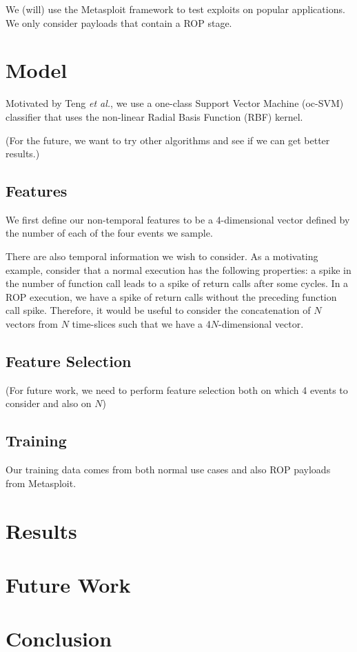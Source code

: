 \documentclass[letterpaper,twocolumn,10pt]{article}
\begin{document}
We (will) use the Metasploit framework to test exploits on popular applications. We only 
consider payloads that contain a ROP stage.

\section{Model}

Motivated by Teng \textit{et al.}, we use a one-class Support Vector Machine (oc-SVM) 
classifier that uses the non-linear Radial Basis Function (RBF) kernel\cite{DBLP:journals/corr/TangSS14}.

(For the future, we want to try other algorithms and see if we can get better results.) 

\subsection*{Features}

We first define our non-temporal features to be a 4-dimensional vector defined 
by the number of each of the four events we sample.

There are also temporal information we wish to consider. As a motivating example, 
consider that a normal execution has the following properties: a spike in the number 
of function call leads to a spike of return calls after some cycles. In a ROP execution, 
we have a spike of return calls without the preceding function call spike. Therefore, 
it would be useful to consider the concatenation of $N$ vectors from $N$ time-slices 
such that we have a 4$N$-dimensional vector.

\subsection*{Feature Selection}

(For future work, we need to perform feature selection both on which 4 events 
to consider and also on $N$)

\subsection*{Training}

Our training data comes from both normal use cases and also ROP payloads from Metasploit.

\section{Results}

\section{Future Work}

\section{Conclusion}

{\footnotesize 
}


\theendnotes
\end{document}
